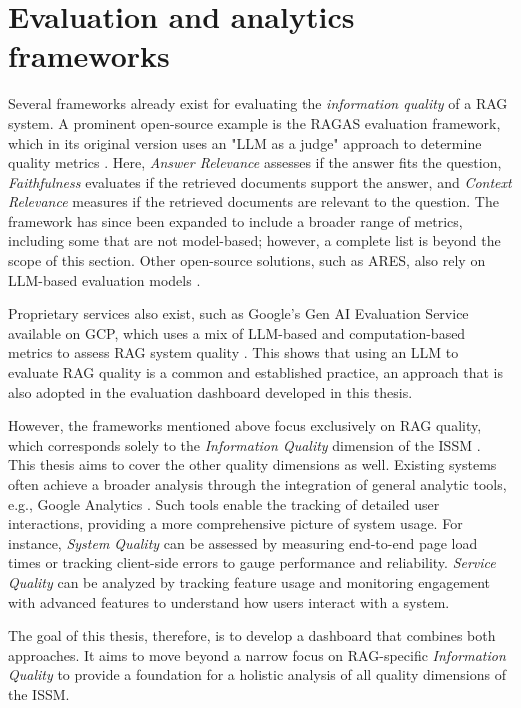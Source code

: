 \documentclass[
	english,
	ruledheaders=section,%
	class=report,%
	thesis={type=bachelor},%
	accentcolor=1b,%
	custommargins=true,%
	marginpar=false,%
	parskip=half-,%
	fontsize=11pt,%
	DIV=14,
]{tudapub}
\begin{document}
\section{Evaluation and analytics frameworks}
Several frameworks already exist for evaluating the \textit{information quality} of a RAG system. A prominent open-source example is the RAGAS evaluation framework, which in its original version uses an "LLM as a judge" approach to determine quality metrics \parencite[pp.~123--124]{Es_James_Espinosa_Anke_Schockaert_2024}. Here, \textit{Answer Relevance} assesses if the answer fits the question, \textit{Faithfulness} evaluates if the retrieved documents support the answer, and \textit{Context Relevance} measures if the retrieved documents are relevant to the question. The framework has since been expanded to include a broader range of metrics, including some that are not model-based; however, a complete list is beyond the scope of this section. Other open-source solutions, such as ARES, also rely on LLM-based evaluation models \parencite[p.~216]{Saad_Falcon_Khattab_Potts_Zaharia_2024}.

Proprietary services also exist, such as Google's Gen AI Evaluation Service available on GCP, which uses a mix of LLM-based and computation-based metrics to assess RAG system quality \parencite{GoogleGenAIEvaluation}. This shows that using an LLM to evaluate RAG quality is a common and established practice, an approach that is also adopted in the evaluation dashboard developed in this thesis.

However, the frameworks mentioned above focus exclusively on RAG quality, which corresponds solely to the \textit{Information Quality} dimension of the ISSM \parencite{DeloneMcLean2003ISSuccessTenYearUpdate}. This thesis aims to cover the other quality dimensions as well. Existing systems often achieve a broader analysis through the integration of general analytic tools, e.g., Google Analytics \parencite{GoogleAnalytics}. Such tools enable the tracking of detailed user interactions, providing a more comprehensive picture of system usage. For instance, \textit{System Quality} \parencite[p.~62]{DeloneMcLean1992ISSuccess} can be assessed by measuring end-to-end page load times or tracking client-side errors to gauge performance and reliability. \textit{Service Quality} \parencite[p.~18]{DeloneMcLean2003ISSuccessTenYearUpdate} can be analyzed by tracking feature usage and monitoring engagement with advanced features to understand how users interact with a system.

The goal of this thesis, therefore, is to develop a dashboard that combines both approaches. It aims to move beyond a narrow focus on RAG-specific \textit{Information Quality} \parencite[pp.~64--66]{DeloneMcLean1992ISSuccess} to provide a foundation for a holistic analysis of all quality dimensions of the ISSM.
\end{document}
